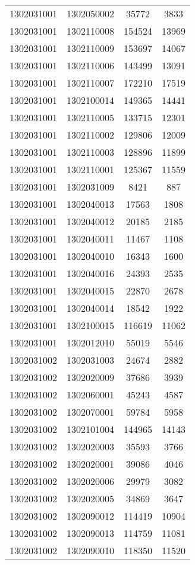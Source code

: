 \begin{longtable}[h]{llcc}
		1302031001 & 1302050002 & 35772 & 3833\\
		1302031001 & 1302110008 & 154524 & 13969\\
		1302031001 & 1302110009 & 153697 & 14067\\
		1302031001 & 1302110006 & 143499 & 13091\\
		1302031001 & 1302110007 & 172210 & 17519\\
		1302031001 & 1302100014 & 149365 & 14441\\
		1302031001 & 1302110005 & 133715 & 12301\\
		1302031001 & 1302110002 & 129806 & 12009\\
		1302031001 & 1302110003 & 128896 & 11899\\
		1302031001 & 1302110001 & 125367 & 11559\\
		1302031001 & 1302031009 & 8421 & 887\\
		1302031001 & 1302040013 & 17563 & 1808\\
		1302031001 & 1302040012 & 20185 & 2185\\
		1302031001 & 1302040011 & 11467 & 1108\\
		1302031001 & 1302040010 & 16343 & 1600\\
		1302031001 & 1302040016 & 24393 & 2535\\
		1302031001 & 1302040015 & 22870 & 2678\\
		1302031001 & 1302040014 & 18542 & 1922\\
		1302031001 & 1302100015 & 116619 & 11062\\
		1302031001 & 1302012010 & 55019 & 5546\\
		1302031002 & 1302031003 & 24674 & 2882\\
		1302031002 & 1302020009 & 37686 & 3939\\
		1302031002 & 1302060001 & 45243 & 4587\\
		1302031002 & 1302070001 & 59784 & 5958\\
		1302031002 & 1302101004 & 144965 & 14143\\
		1302031002 & 1302020003 & 35593 & 3766\\
		1302031002 & 1302020001 & 39086 & 4046\\
		1302031002 & 1302020006 & 29979 & 3082\\
		1302031002 & 1302020005 & 34869 & 3647\\
		1302031002 & 1302090012 & 114419 & 10904\\
		1302031002 & 1302090013 & 114759 & 11081\\
		1302031002 & 1302090010 & 118350 & 11520\\

\end{longtable}

